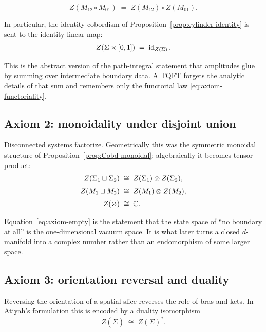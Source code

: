 \begin{equation}\label{eq:axiom-functoriality}
Z(M_{12} \circ M_{01}) \;=\; Z(M_{12}) \circ Z(M_{01}).
\end{equation}

\noindent In particular, the identity cobordism of Proposition~\ref{prop:cylinder-identity} is sent to the identity linear map:
\begin{equation}\label{eq:axiom-identity}
Z(\Sigma \times [0,1]) \;=\; \operatorname{id}_{Z(\Sigma)}.
\end{equation}

\noindent This is the abstract version of the path-integral statement that amplitudes glue by summing over intermediate boundary data. A TQFT forgets the analytic details of that sum and remembers only the functorial law \eqref{eq:axiom-functoriality}.

\subsection{Axiom 2: monoidality under disjoint union}

Disconnected systems factorize. Geometrically this was the symmetric monoidal structure of Proposition~\ref{prop:Cobd-monoidal}; algebraically it becomes tensor product:
\begin{align}
Z(\Sigma_1 \sqcup \Sigma_2) &\;\cong\; Z(\Sigma_1)\otimes Z(\Sigma_2), \label{eq:axiom-monoidal-objects} \\[1mm]
Z(M_1 \sqcup M_2) &\;\cong\; Z(M_1)\otimes Z(M_2), \label{eq:axiom-monoidal-morphisms} \\[1mm]
Z(\varnothing) &\;\cong\; \mathbb{C}. \label{eq:axiom-empty}
\end{align}

\noindent Equation~\eqref{eq:axiom-empty} is the statement that the state space of ``no boundary at all'' is the one-dimensional vacuum space. It is what later turns a closed $d$-manifold into a complex number rather than an endomorphism of some larger space.

\subsection{Axiom 3: orientation reversal and duality}

Reversing the orientation of a spatial slice reverses the role of bras and kets. In Atiyah's formulation this is encoded by a duality isomorphism
\begin{equation}\label{eq:axiom-duality}
Z(\overline{\Sigma}) \;\cong\; Z(\Sigma)^*.
\end{equation}

